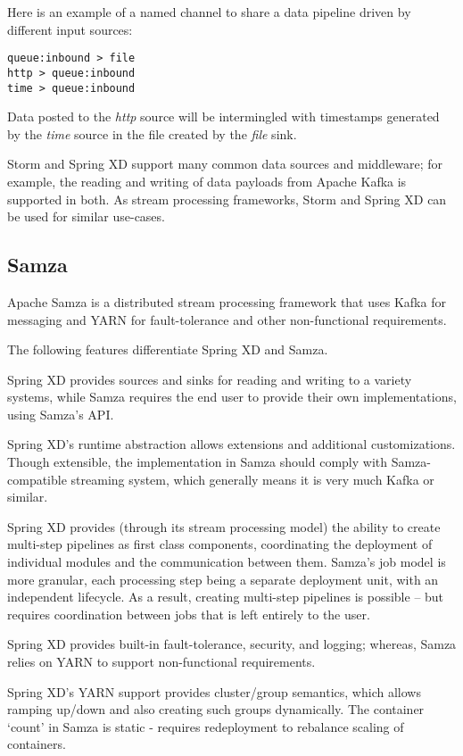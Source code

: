 Here is an example of a named channel to share a data pipeline driven
by different input sources:

\begin{lstlisting}
queue:inbound > file
http > queue:inbound
time > queue:inbound
\end{lstlisting}

Data posted to the \emph{http} source will be intermingled with timestamps
generated by the \emph{time} source in the file created by the \emph{file}
sink.

Storm and Spring XD support many common data sources and middleware;
for example, the reading and writing of data payloads from Apache Kafka
is supported in both. As stream processing frameworks, Storm and Spring
XD can be used for similar use-cases.

\subsection{Samza}
Apache Samza\cite{samza} is a distributed stream processing framework that uses
Kafka for messaging and YARN for fault-tolerance and other non-functional
requirements.

The following features differentiate Spring XD and Samza.

\begin{itemize*}
\item Spring XD provides sources and sinks for reading and writing to a
variety systems, while Samza requires the end user to provide their
own implementations, using Samza's API.
\item Spring XD's runtime abstraction allows extensions and additional
customizations. Though extensible, the implementation in Samza should comply with
Samza-compatible streaming system, which generally means it is very much Kafka
or similar.
\item Spring XD provides (through its stream processing model) the ability to
create multi-step pipelines as first class components, coordinating the deployment of individual
modules and the communication between them. Samza's job model is more granular, each
processing step being a separate deployment unit, with an independent lifecycle.
As a result, creating multi-step pipelines is possible -- but requires coordination
between jobs that is left entirely to the user.
\item Spring XD provides built-in fault-tolerance, security, and logging; whereas,
Samza relies on YARN to support non-functional requirements.
\item Spring XD's YARN support provides cluster/group semantics, which allows
ramping up/down and also creating such groups dynamically. The container `count'
in Samza is static - requires redeployment to rebalance scaling of containers.
\end{itemize*}

